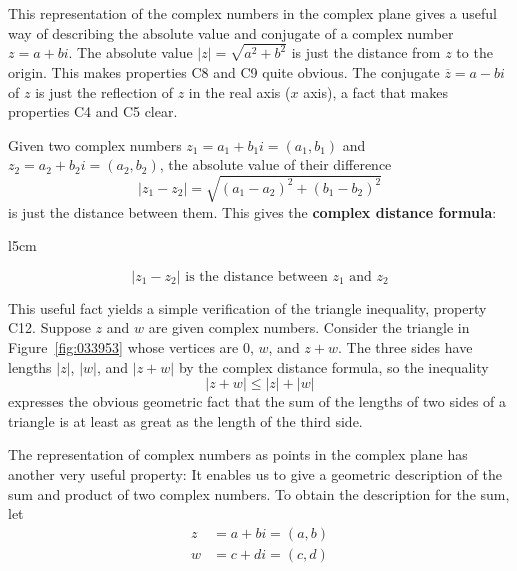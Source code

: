 This representation of the complex 
numbers in the complex plane gives a useful way of describing the 
absolute value and conjugate of a complex number $z = a + bi$. The absolute value $|z| = \sqrt{a^2+b^2}$
 is just the distance from $z$ to the origin. This makes properties C8 and C9 quite obvious. The conjugate $\overline{z} = a-bi$ of $z$ is just the reflection of $z$ in the real axis ($x$ axis), a fact that makes properties C4 and C5 clear.


Given two complex numbers $z_{1} = a_{1} + b_{1}i = (a_{1}, b_{1})$ and $z_{2} = a_{2} + b_{2}i = (a_{2}, b_{2})$, the absolute value of their difference
\begin{equation*}
|z_1 - z_2| = \sqrt{(a_1-a_2)^2 + (b_1 - b_2)^2}
\end{equation*}
is just the distance between them. This gives the \textbf{complex distance formula}:

\begin{wrapfigure}[11]{l}{5cm}
        \vspace*{-2em}
	\centering
	
	\caption{\label{fig:033953}}
\end{wrapfigure}

\begin{equation*}
|z_1 - z_2| \mbox{ is the distance between } z_1 \mbox{ and } z_2 
\end{equation*}

This useful fact yields a simple verification of the triangle inequality, property C12. Suppose $z$ and $w$ are given complex numbers. Consider the triangle in Figure~\ref{fig:033953} whose vertices are $0$, $w$, and $z + w$. The three sides have lengths $|z|$, $|w|$, and $|z + w|$ by the complex distance formula, so the inequality
\begin{equation*}
|z+w| \leq |z| + |w|
\end{equation*}
expresses the obvious geometric fact that the sum of the lengths of two 
sides of a triangle is at least as great as the length of the third 
side.

The representation of complex numbers 
as points in the complex plane has another very useful property: It 
enables us to give a geometric description of the sum and product of two
 complex numbers. To obtain the description for the sum, let
\begin{align*}
z & = a+bi = (a,b) \\
w & = c+di = (c,d)
\end{align*}

